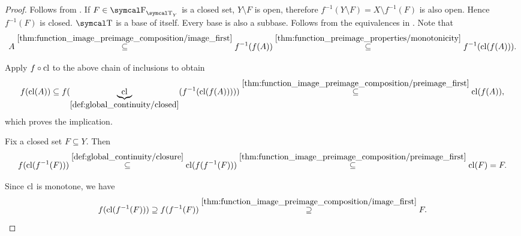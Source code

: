 \begin{proof}
   Follows from .
   If \( F \in \CF_{\CT_Y} \) is a closed set, \( Y \setminus F \) is open, therefore \( f^{-1}(Y \setminus F) = X \setminus f^{-1}(F) \) is also open. Hence \( f^{-1}(F) \) is closed.
   \( \CT \) is a base of itself.
   Every base is also a subbase.
   Follows from the equivalences in .
   Note that
  \begin{equation*}
    A
    \overset {\ref{thm:function_image_preimage_composition/image_first}} \subseteq
    f^{-1}(f(A))
    \overset {\ref{thm:function_preimage_properties/monotonicity}} \subseteq
    f^{-1}(\operatorname{cl}(f(A))).
  \end{equation*}

  Apply \( f \circ \operatorname{cl} \) to the above chain of inclusions to obtain
  \begin{equation*}
    f(\operatorname{cl}(A))
    \subseteq
    f(\underbrace{\operatorname{cl}}_{\ref{def:global_continuity/closed}}(f^{-1}(\operatorname{cl}(f(A)))))
    \overset {\ref{thm:function_image_preimage_composition/preimage_first}} \subseteq
    \operatorname{cl}(f(A)),
  \end{equation*}
  which proves the implication.

   Fix a closed set \( F \subseteq Y \). Then
  \begin{equation}\label{def:global_continuity/closure_implies_closed_right}
    f(\operatorname{cl}(f^{-1}(F)))
    \overset {\ref{def:global_continuity/closure}} \subseteq
    \operatorname{cl}(f(f^{-1}(F)))
    \overset {\ref{thm:function_image_preimage_composition/preimage_first}} \subseteq
    \operatorname{cl}(F)
    =
    F.
  \end{equation}

  Since \( \operatorname{cl} \) is monotone, we have
  \begin{equation}\label{def:global_continuity/closure_implies_closed_left}
    f(\operatorname{cl}(f^{-1}(F)))
    \supseteq
    f(f^{-1}(F))
    \overset {\ref{thm:function_image_preimage_composition/image_first}} \supseteq
    F.
  \end{equation}


\end{proof}

